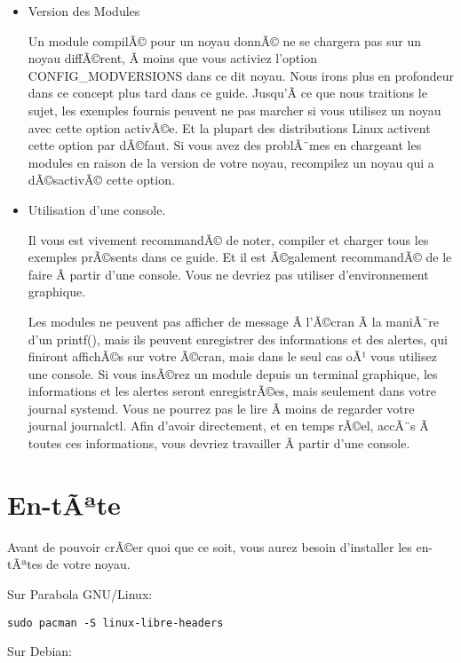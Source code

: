 \documentclass[11pt]{article}
\begin{document}
\begin{itemize}
\item Version des Modules
\label{sec-1-8-0-1}

Un module compilÃ© pour un noyau donnÃ© ne se chargera pas sur un noyau diffÃ©rent, Ã  moins que vous activiez l'option CONFIG\_MODVERSIONS dans ce dit noyau. Nous irons plus en profondeur dans ce concept plus tard dans ce guide. Jusqu'Ã  ce que nous traitions le sujet, les exemples fournis peuvent ne pas marcher si vous utilisez un noyau avec cette option activÃ©e. Et la plupart des distributions Linux activent cette option par dÃ©faut. Si vous avez des problÃ¨mes en chargeant les modules en raison de la version de votre noyau, recompilez un noyau qui a dÃ©sactivÃ© cette option.

\item Utilisation d'une console.
\label{sec-1-8-0-2}

Il vous est vivement recommandÃ© de noter, compiler et charger tous les exemples prÃ©sents dans ce guide. Et il est Ã©galement recommandÃ© de le faire Ã  partir d'une console. Vous ne devriez pas utiliser d'environnement graphique.

Les modules ne peuvent pas afficher de message Ã  l'Ã©cran Ã  la maniÃ¨re d'un printf(), mais ils peuvent enregistrer des informations et des alertes, qui finiront affichÃ©s sur votre Ã©cran, mais dans le seul cas oÃ¹ vous utilisez une console. Si vous insÃ©rez un module depuis un terminal graphique, les informations et les alertes seront enregistrÃ©es, mais seulement dans votre journal systemd. Vous ne pourrez pas le lire Ã  moins de regarder votre journal journalctl. Afin d'avoir directement, et en temps rÃ©el, accÃ¨s Ã  toutes ces informations, vous devriez travailler Ã  partir d'une console.
\end{itemize}

\section*{En-tÃªte}
\label{sec-2}

Avant de pouvoir crÃ©er quoi que ce soit, vous aurez besoin d'installer les en-tÃªtes de votre noyau.

Sur Parabola GNU/Linux:

\begin{verbatim}
sudo pacman -S linux-libre-headers
\end{verbatim}

Sur Debian:
\end{document}
